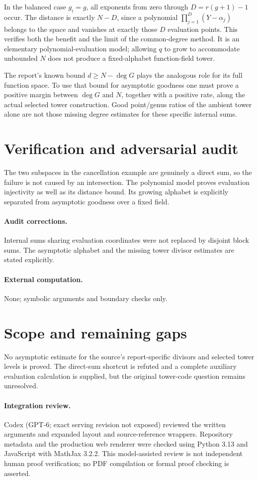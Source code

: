 \documentclass[11pt]{article}
\begin{document}
In the balanced case $g_i=g$, all exponents from zero through $D=r(g+1)-1$ occur. The distance is exactly $N-D$, since a polynomial $\prod_{j=1}^{D}(Y-\alpha_j)$ belongs to the space and vanishes at exactly those $D$ evaluation points. This verifies both the benefit and the limit of the common-degree method. It is an elementary polynomial-evaluation model; allowing $q$ to grow to accommodate unbounded $N$ does not produce a fixed-alphabet function-field tower.

The report's known bound $d\geq N-\deg G$ plays the analogous role for its full function space. To use that bound for asymptotic goodness one must prove a positive margin between $\deg G$ and $N$, together with a positive rate, along the actual selected tower construction. Good point/genus ratios of the ambient tower alone are not those missing degree estimates for these specific internal sums.
\section{Verification and adversarial audit}
The two subspaces in the cancellation example are genuinely a direct sum, so the failure is not caused by an intersection. The polynomial model proves evaluation injectivity as well as its distance bound. Its growing alphabet is explicitly separated from asymptotic goodness over a fixed field.
\paragraph{Audit corrections.} Internal sums sharing evaluation coordinates were not replaced by disjoint block sums. The asymptotic alphabet and the missing tower divisor estimates are stated explicitly.
\paragraph{External computation.} None; symbolic arguments and boundary checks only.
\section{Scope and remaining gaps}
No asymptotic estimate for the source's report-specific divisors and selected tower levels is proved. The direct-sum shortcut is refuted and a complete auxiliary evaluation calculation is supplied, but the original tower-code question remains unresolved.
\paragraph{Integration review.} Codex (GPT-6; exact serving revision not exposed) reviewed the written arguments and expanded layout and source-reference wrappers. Repository metadata and the production web renderer were checked using Python 3.13 and JavaScript with MathJax 3.2.2. This model-assisted review is not independent human proof verification; no PDF compilation or formal proof checking is asserted.
\end{document}
